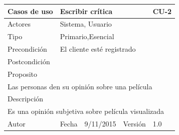 \documentclass{article}
\begin{document}
\clearpage
\begin{table}[h]
\begin{tabular}{|l|l|l|l|l|l|}
\hline
\multicolumn{2}{|p{2cm}|}{Casos de uso}  & \multicolumn{3}{p{7cm}|}{Escribir crítica} & CU-2 \\
\hline
\multicolumn{2}{|p{2cm}|}{Actores}       & \multicolumn{4}{p{8cm}|}{Sistema, Usuario}        \\
\hline
\multicolumn{2}{|p{2cm}|}{Tipo}          & \multicolumn{4}{p{8cm}|}{Primario,Esencial}        \\
\hline
\multicolumn{2}{|p{2cm}|}{Precondición}  & \multicolumn{4}{p{8cm}|}{El cliente esté registrado}        \\
\hline
\multicolumn{2}{|p{2cm}|}{Postcondición} & \multicolumn{4}{p{8cm}|}{}        \\
\hline
\multicolumn{6}{|p{10cm}|}{Proposito}                                   \\
\hline
\multicolumn{6}{|p{10cm}|}{Las personas den su opinión sobre una película}                                            \\
\hline
\multicolumn{6}{|p{10cm}|}{Descripción}                                 \\
\hline
\multicolumn{6}{|p{10cm}|}{Es una opinión subjetiva sobre película visualizada}                                            \\
\hline
Autor              &              & Fecha    & 9/11/2015    &   Versión  &1.0\\
\hline
\end{tabular}
\end{table}
\end{document}
